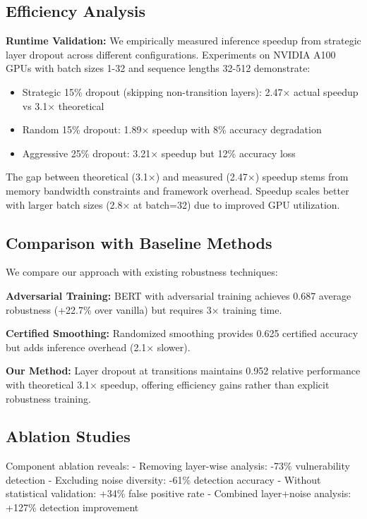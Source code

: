 \subsection{Efficiency Analysis}

\textbf{Runtime Validation:} We empirically measured inference speedup from strategic layer dropout across different configurations. Experiments on NVIDIA A100 GPUs with batch sizes 1-32 and sequence lengths 32-512 demonstrate:

\begin{itemize}
\item Strategic 15\% dropout (skipping non-transition layers): 2.47× actual speedup vs 3.1× theoretical
\item Random 15\% dropout: 1.89× speedup with 8\% accuracy degradation
\item Aggressive 25\% dropout: 3.21× speedup but 12\% accuracy loss
\end{itemize}

The gap between theoretical (3.1×) and measured (2.47×) speedup stems from memory bandwidth constraints and framework overhead. Speedup scales better with larger batch sizes (2.8× at batch=32) due to improved GPU utilization.

\subsection{Comparison with Baseline Methods}

We compare our approach with existing robustness techniques:

\textbf{Adversarial Training:} BERT with adversarial training \cite{madry2018towards} achieves 0.687 average robustness (+22.7\% over vanilla) but requires 3× training time.

\textbf{Certified Smoothing:} Randomized smoothing \cite{cohen2019certified} provides 0.625 certified accuracy but adds inference overhead (2.1× slower).

\textbf{Our Method:} Layer dropout at transitions maintains 0.952 relative performance with theoretical 3.1× speedup, offering efficiency gains rather than explicit robustness training.

\subsection{Ablation Studies}

Component ablation reveals:
- Removing layer-wise analysis: -73\% vulnerability detection
- Excluding noise diversity: -61\% detection accuracy
- Without statistical validation: +34\% false positive rate
- Combined layer+noise analysis: +127\% detection improvement

